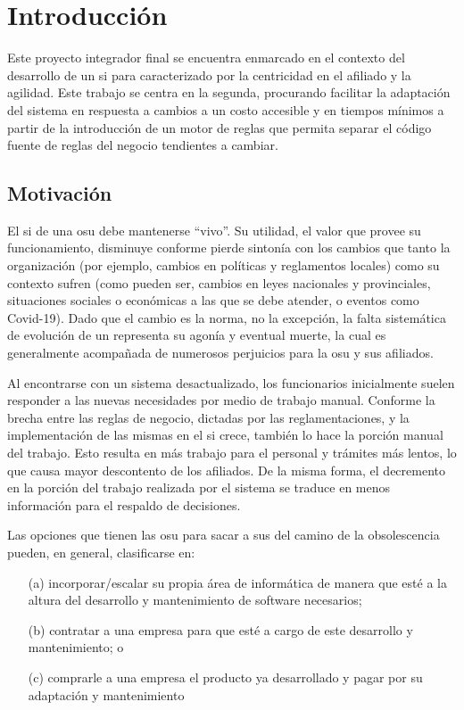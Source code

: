 \section{Introducción}\label{sec:intro}

Este proyecto integrador final se encuentra enmarcado en el contexto del desarrollo de un \acrfull{si} para  caracterizado por la centricidad en el afiliado y la agilidad. Este trabajo se centra en la segunda, procurando facilitar la adaptación del sistema en respuesta a cambios a un costo accesible y en tiempos mínimos a partir de la introducción de un motor de reglas que permita separar el código fuente de reglas del negocio tendientes a cambiar.

\subsection{Motivación}\label{ssec:motivacion}

El \acrshort{si} de una \acrshort{osu} debe mantenerse ``vivo''. 
Su utilidad, el valor que provee su funcionamiento, disminuye conforme pierde sintonía con los cambios que tanto la organización (por ejemplo, cambios en políticas y reglamentos locales) como su contexto sufren (como pueden ser, cambios en leyes nacionales y provinciales, situaciones sociales o económicas a las que se debe atender, o eventos como Covid-19).
Dado que el cambio es la norma, no la excepción, la falta sistemática de evolución de un {\SIOSU} representa su agonía y eventual muerte, la cual es generalmente acompañada de numerosos perjuicios para la \acrshort{osu} y sus afiliados.

Al encontrarse con un sistema desactualizado, los funcionarios inicialmente suelen responder a las nuevas necesidades por medio de trabajo manual. Conforme la brecha entre las reglas de negocio, dictadas por las reglamentaciones, y la implementación de las mismas en el \acrshort{si} crece, también lo hace la porción manual del trabajo. Esto resulta en más trabajo para el personal y trámites más lentos, lo que causa mayor descontento de los afiliados. De la misma forma, el decremento en la porción del trabajo realizada por el sistema se traduce en menos información para el respaldo de decisiones.

Las opciones que tienen las \acrshort{osu} para sacar a sus  del camino de la obsolescencia pueden, en general, clasificarse en:

\begin{enumerate}
    \item [(a)] incorporar/escalar su propia área de informática de manera que esté a la altura del desarrollo y mantenimiento de software necesarios;
    \item [(b)] contratar a una empresa para que esté a cargo de este desarrollo y mantenimiento; o
    \item [(c)] comprarle a una empresa el producto ya desarrollado y pagar por su adaptación y mantenimiento 
\end{enumerate} 

